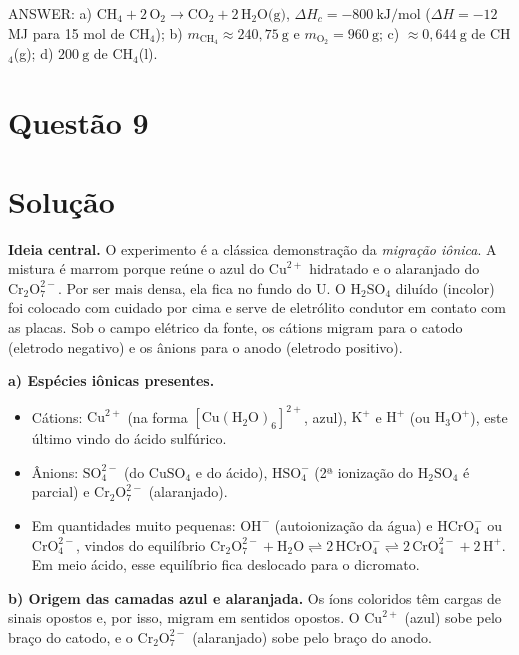\documentclass{article}%
\begin{document}
ANSWER: a) $\text{CH}_4+2\,\text{O}_2\to\text{CO}_2+2\,\text{H}_2\text{O(g)}$, $\Delta H_c=-800\ \text{kJ/mol}$ ($\Delta H=-12$ MJ para 15 mol de CH$_4$); b) $m_{\text{CH}_4}\approx 240{,}75\ \text{g}$ e $m_{\text{O}_2}=960\ \text{g}$; c) $\approx 0{,}644\ \text{g}$ de CH$_4$(g); d) $200\ \text{g}$ de CH$_4$(l).%
\newpage%
\section*{Questão 9}

\section*{Solução}

\textbf{Ideia central.} O experimento é a clássica demonstração da \emph{migração iônica}. A mistura é marrom porque reúne o azul do $\text{Cu}^{2+}$ hidratado e o alaranjado do $\text{Cr}_2\text{O}_7^{2-}$. Por ser mais densa, ela fica no fundo do U. O $\text{H}_2\text{SO}_4$ diluído (incolor) foi colocado com cuidado por cima e serve de eletrólito condutor em contato com as placas. Sob o campo elétrico da fonte, os cátions migram para o catodo (eletrodo negativo) e os ânions para o anodo (eletrodo positivo).

\medskip
\textbf{a) Espécies iônicas presentes.}
\begin{itemize}
\item Cátions: $\text{Cu}^{2+}$ (na forma $[\text{Cu}(\text{H}_2\text{O})_6]^{2+}$, azul), $\text{K}^{+}$ e $\text{H}^{+}$ (ou $\text{H}_3\text{O}^{+}$), este último vindo do ácido sulfúrico.
\item Ânions: $\text{SO}_4^{2-}$ (do $\text{CuSO}_4$ e do ácido), $\text{HSO}_4^{-}$ (2ª ionização do $\text{H}_2\text{SO}_4$ é parcial) e $\text{Cr}_2\text{O}_7^{2-}$ (alaranjado).
\item Em quantidades muito pequenas: $\text{OH}^{-}$ (autoionização da água) e $\text{HCrO}_4^{-}$ ou $\text{CrO}_4^{2-}$, vindos do equilíbrio
$\text{Cr}_2\text{O}_7^{2-} + \text{H}_2\text{O} \rightleftharpoons 2\,\text{HCrO}_4^{-} \rightleftharpoons 2\,\text{CrO}_4^{2-} + 2\,\text{H}^{+}$. Em meio ácido, esse equilíbrio fica deslocado para o dicromato.
\end{itemize}

\textbf{b) Origem das camadas azul e alaranjada.}
Os íons coloridos têm cargas de sinais opostos e, por isso, migram em sentidos opostos. O $\text{Cu}^{2+}$ (azul) sobe pelo braço do catodo, e o $\text{Cr}_2\text{O}_7^{2-}$ (alaranjado) sobe pelo braço do anodo.
\end{document}
